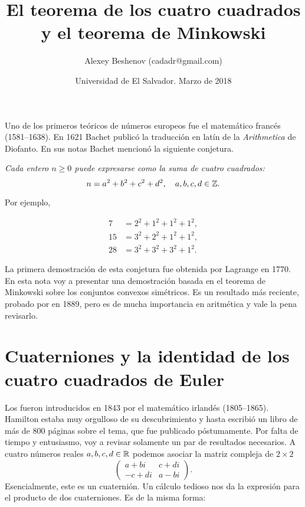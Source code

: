 \documentclass{article}
\author{Alexey Beshenov (cadadr@gmail.com)}
\title{El teorema de los cuatro cuadrados\\
y el teorema de Minkowski}
\date{Universidad de El Salvador. Marzo de 2018}
\numberwithin{equation}{section}
\begin{document}
{\normalfont\sffamily\bfseries \maketitle}

Uno de los primeros teóricos de números europeos fue el matemático francés
 (1581--1638). En 1621 Bachet
publicó la traducción en latín de la \emph{Arithmetica} de Diofanto. En sus
notas Bachet mencionó la siguiente conjetura.

\vspace{1em}

\emph{Cada entero $n\ge 0$ puede expresarse como la suma de cuatro cuadrados:
$$n = a^2 + b^2 + c^2 + d^2, \quad a,b,c,d\in\mathbb{Z}.$$}

Por ejemplo,

\begin{align*}
  7 & = 2^2 + 1^2 + 1^2 + 1^2, \\
  15 & = 3^2 + 2^2 + 1^2 + 1^2, \\
  28 & = 3^2 + 3^2 + 3^2 + 1^2.
\end{align*}

La primera demostración de esta conjetura fue obtenida por Lagrange en 1770. En
esta nota voy a presentar una demostración basada en el teorema de Minkowski
sobre los conjuntos convexos simétricos. Es un resultado más reciente, probado
por  en 1889, pero es de mucha importancia en
aritmética y vale la pena revisarlo.


\section{Cuaterniones y la identidad de los cuatro cuadrados de Euler}

Los  fueron introducidos en 1843 por el matemático irlandés
 (1805--1865). Hamilton estaba muy orgulloso
de su descubrimiento y hasta escribió un libro de más de 800 páginas sobre el
tema, que fue publicado póstumamente. Por falta de tiempo y entusiasmo, voy a
revisar solamente un par de resultados necesarios. A cuatro números reales
$a,b,c,d\in \mathbb{R}$ podemos asociar la matriz compleja de $2\times 2$
\[ \begin{pmatrix}
    a+bi & c+di\\
    -c + d i & a - bi
  \end{pmatrix}. \]
Esencialmente, este es un cuaternión. Un cálculo tedioso nos da la expresión
para el producto de dos cuaterniones. Es de la misma forma:
\end{document}
